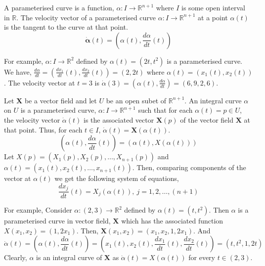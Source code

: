 \begin{definition}
	A parameterised curve is a function, $\alpha : I \to \mathbb{R}^{n+1}$ where $I$ is some open interval in $\mathbb{R}$.
	The velocity vector of a parameterised curve $\alpha : I \to \mathbb{R}^{n+1}$ at a point $\alpha(t)$ is the tangent to the curve at that point.
	\begin{equation}
		\dot{\mathbf{\alpha}}(t) = \left(\alpha(t),\frac{d \alpha}{dt} (t)\right)
	\end{equation}
\end{definition}

For example, $\alpha : I \to \mathbb{R}^2$ defined by $\alpha(t) = (2t,t^2)$ is a parameterised curve.
We have, $\frac{d\alpha}{dt} = (\frac{dx_1}{dt}(t),\frac{dx_2}{dt}(t)) = (2,2t)$ where $\alpha(t) = (x_1(t),x_2(t))$.
The velocity vector at $t = 3$ is $\dot{\alpha}(3) = (\alpha(t),\frac{d\alpha}{dt}) = (6,9,2,6)$.

\begin{definition}
	Let $\mathbf{X}$ be a vector field and let $U$ be an open subet of $\mathbb{R}^{n+1}$.
	An integral curve $\alpha$ on $U$ is a parameterised curve, $\alpha : I \to \mathbb{R}^{n+1}$ such that for each $\alpha(t) = p \in U$, the velocity vector $\dot{\alpha}(t)$ is the associated vector $\mathbf{X}(p)$ of the vector field $\mathbf{X}$ at that point.
	Thus, for each $t \in I$, $\dot{\alpha}(t) = \mathbf{X}(\alpha(t))$.
	\begin{equation}
		\left(\alpha(t),\frac{d \alpha}{dt}(t)\right) = \left(\alpha(t),X(\alpha(t))\right)
	\end{equation}
	Let $X(p) = \left(X_1(p),X_2(p),\dots,X_{n+1}(p)\right)$ and $\alpha(t) = \left(x_1(t),x_2(t),\dots,x_{n+1}(t)\right)$.
	Then, comparing components of the vector at $\alpha(t)$ we get the following system of equations,
	\begin{equation}
		\frac{d x_j}{dt}(t) = X_j(\alpha(t)),\ j = 1,2,\dots,(n+1)
	\end{equation}
\end{definition}

For example, Consider $\alpha : (2,3) \to \mathbb{R}^2$ defined by $\alpha(t) = (t,t^2)$.
Then $\alpha$ is a parameterised curve in vector field, $\mathbf{X}$ which has the associated function $X(x_1,x_2) = (1,2x_1)$.
Then, $\mathbf{X}(x_1,x_2) = (x_1,x_2,1,2x_1)$.
And
\[ \dot{\alpha}(t) = \left( \alpha(t),\frac{d\alpha}{dt}(t) \right) = \left( x_1(t),x_2(t),\frac{dx_1}{dt}(t), \frac{dx_2}{dt}(t) \right) = (t,t^2,1,2t) \]
Clearly, $\alpha$ is an integral curve of $\mathbf{X}$ as $\dot{\alpha}(t) = X(\alpha(t))$ for every $t \in (2,3)$.

